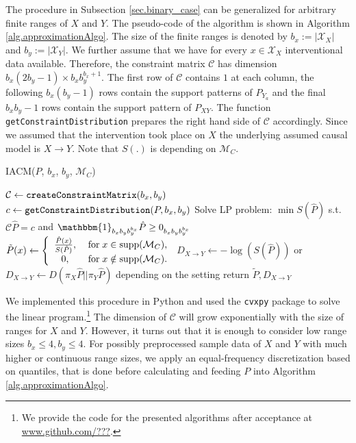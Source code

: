 \documentclass[letterpaper]{article}
\newcommand{\kC}{\mathcal{C}}   %
\newcommand{\kM}{\mathcal{M}}   %
\newcommand{\kX}{\mathcal{X}}   %
\newcommand{\Ind}{\mathbbm{1}} %
\newcommand{\code}[1]{\texttt{#1}}
\newcommand{\supp}{{\rm supp}}
\begin{document}
The procedure in Subsection \ref{sec.binary_case} can be generalized for arbitrary finite ranges of $X$ and $Y$. The pseudo-code of the algorithm is shown in Algorithm \ref{alg.approximationAlgo}. The size of the finite ranges is denoted by $b_x := |\kX_X|$ and $b_y := |\kX_Y|$. We further assume that we have for every $x \in \kX_X$ interventional data available. Therefore, the constraint matrix $\kC$ has dimension $b_x (2b_y -1) \times b_x b_y^{b_x +1}$. The first row of $\kC$ contains $1$ at each column, the following $b_x(b_y-1)$ rows contain the support patterns of $P_{Y_{a}}$ and the final $b_x b_y -1$ rows contain the support pattern of $P_{XY}$.
The function \code{getConstraintDistribution} prepares the right hand side of $\kC$ accordingly. Since we assumed that the intervention took place on $X$ the underlying assumed causal model is $X \rightarrow Y$. Note that $S(.)$ is depending on $\kM_C$.

\begin{algorithm}
\caption{IACM($P$, $b_x$, $b_y$, $\kM_C$)}
\label{alg.approximationAlgo}
\begin{algorithmic}[1]
\State $\kC \gets {\rm \code{createConstraintMatrix}}(b_x, b_y)$
\State $c \gets {\rm \code{getConstraintDistribution}}(P, b_x, b_y)$
\State Solve LP problem: $\min S(\hat P)$ s.t. $\kC \hat P = c$ and $\Ind_{b_x b_y b_y^{b_x}} \hat P \ge 0_{b_x b_y b_y^{b_x}}$
\State $\tilde P(x) \gets \left \{ \begin{array}{cc} \frac{\hat P(x)}{S(\hat P)}, & \;{\rm for}\; x\in \supp(\kM_C), \\
0, & \; {\rm for}\; x\notin\supp(\kM_C). \end{array} \right.$
\State $D_{X\rightarrow Y} \gets -\log(S(\hat P))$ or $D_{X\rightarrow Y} \gets D(\pi_X \hat P|| \pi_Y \hat P)$ depending on the setting
\State return $\tilde P, D_{X \rightarrow Y}$
\end{algorithmic}
\end{algorithm}

We implemented this procedure in Python and used the \code{cvxpy} package to solve the linear program.\footnote{We provide the code for the presented algorithms after acceptance at \url{www.github.com/???}.} The dimension of $\kC$ will grow exponentially with the size of ranges for $X$ and $Y$. However, it turns out that it is enough to consider low range sizes $b_x \le 4, b_y \le 4$. For possibly preprocessed sample data of $X$ and $Y$ with much higher or continuous range sizes, we apply an equal-frequency discretization based on quantiles, that is done before calculating and feeding $P$ into Algorithm \ref{alg.approximationAlgo}.
\end{document}

